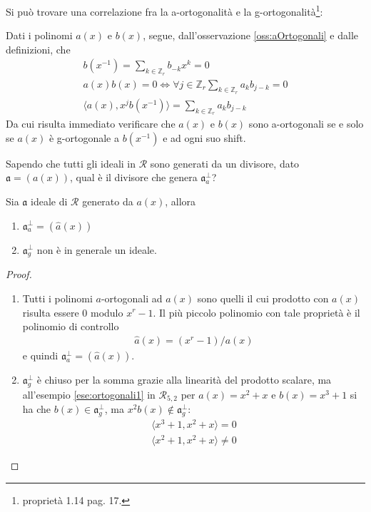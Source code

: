 Si può trovare una correlazione fra la a-ortogonalità e la g-ortogonalità\footnote{\cite{cerruti} proprietà 1.14 pag. 17.}:
\begin{osservazione} \label{oss:aOrtogonali2}
   Dati i polinomi $a(x)$ e $b(x)$, segue, dall'osservazione \ref{oss:aOrtogonali} e dalle definizioni, che 
   \begin{align*}
      b(x^{-1}) = \sum_{k \in \mathbb{Z}_{r}} b_{-k}x^{k} = 0 \\
      a(x)b(x) = 0 \iff \forall j \in \mathbb{Z}_{r}  \sum_{k \in \mathbb{Z}_{r}} a_{k}b_{j-k} = 0 \\
      \langle a(x), x^{j}b(x^{-1}) \rangle = \sum_{k \in \mathbb{Z}_{r} } a_{k}b_{j-k}
   \end{align*}
   Da cui risulta immediato verificare che $a(x)$ e $b(x)$ sono a-ortogonali se e solo se $a(x)$ è g-ortogonale a $b(x^{-1})$ e ad ogni suo shift.
\end{osservazione}
Sapendo che tutti gli ideali in $\mathcal{R}$ sono generati da un divisore, dato $\mathfrak{a} = (a(x))$, qual è il divisore che genera $\mathfrak{a}_{a}^{\perp}$?
\begin{lemmax} \label{lemma:idOrtogonali}
   Sia $\mathfrak{a} $ ideale di $\mathcal{R}$ generato da $a(x)$, allora
   \begin{enumerate}
      \item $\mathfrak{a}_{a}^{\perp} = (\hat{a}(x))$
      \item $\mathfrak{a}_{g}^{\perp} $ non è in generale un ideale.
   \end{enumerate}
\end{lemmax}
\begin{proof}
   \begin{enumerate}
      \item Tutti i polinomi $a$-ortogonali ad $a(x)$ sono quelli il cui prodotto con $a(x)$ risulta essere $0$ modulo $x^r - 1$. Il più piccolo polinomio con tale proprietà è il polinomio di controllo
      \begin{align*}
         \hat{a}(x) = (x^r-1)/a(x) 
      \end{align*}
      e quindi $\mathfrak{a}_{a}^{\perp} = (\hat{a}(x))$.
      \item $\mathfrak{a}_{g}^{\perp} $ è chiuso per la somma grazie alla linearità del prodotto scalare, ma all'esempio \ref{ese:ortogonali1} in $\mathcal{R}_{5,2}$ per $a(x) = x^2+x$ e $b(x) = x^3 + 1$ si ha che $b(x) \in \mathfrak{a}_{g}^{\perp}$, ma $x^{2}b(x) \notin \mathfrak{a}_{g}^{\perp}$:
      \begin{align*}
         \langle x^3 + 1, x^2+x \rangle = 0\\
         \langle x^2 + 1, x^2+x \rangle \neq 0
      \end{align*}    
   \end{enumerate}
\end{proof}
